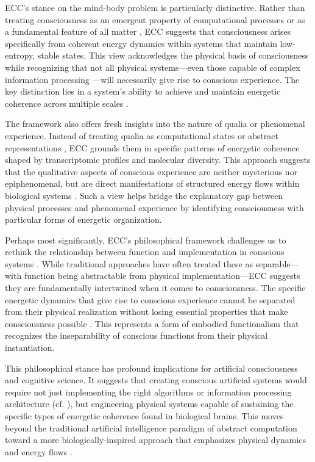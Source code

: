 \begin{refsection}
ECC's stance on the mind-body problem is particularly distinctive. Rather than treating consciousness as an emergent property of computational processes \cite{piccinini2020neurocognitive} or as a fundamental feature of all matter \cite{Goff2019}, ECC suggests that consciousness arises specifically from coherent energy dynamics within systems that maintain low-entropy, stable states. This view acknowledges the physical basis of consciousness while recognizing that not all physical systems—even those capable of complex information processing \cite{tononi2016integrated}—will necessarily give rise to conscious experience. The key distinction lies in a system's ability to achieve and maintain energetic coherence across multiple scales \cite{horst2011symbols}.

The framework also offers fresh insights into the nature of qualia or phenomenal experience. Instead of treating qualia as computational states or abstract representations \cite{bishop2009computers}, ECC grounds them in specific patterns of energetic coherence shaped by transcriptomic profiles and molecular diversity. This approach suggests that the qualitative aspects of conscious experience are neither mysterious nor epiphenomenal, but are direct manifestations of structured energy flows within biological systems \cite{noe2009out}. Such a view helps bridge the explanatory gap between physical processes and phenomenal experience by identifying consciousness with particular forms of energetic organization.

Perhaps most significantly, ECC's philosophical framework challenges us to rethink the relationship between function and implementation in conscious systems \cite{piccinini2013neural}. While traditional approaches have often treated these as separable—with function being abstractable from physical implementation—ECC suggests they are fundamentally intertwined when it comes to consciousness. The specific energetic dynamics that give rise to conscious experience cannot be separated from their physical realization without losing essential properties that make consciousness possible \cite{van1995might}. This represents a form of embodied functionalism that recognizes the inseparability of conscious functions from their physical instantiation.

This philosophical stance has profound implications for artificial consciousness and cognitive science. It suggests that creating conscious artificial systems would require not just implementing the right algorithms or information processing architecture \cite{searle1980minds} (cf. \cite{butlin2023consciousnessartificialintelligenceinsights}), but engineering physical systems capable of sustaining the specific types of energetic coherence found in biological brains. This moves beyond the traditional artificial intelligence paradigm of abstract computation toward a more biologically-inspired approach that emphasizes physical dynamics and energy flows \cite{dreyfus1992computers}.


\end{refsection}
